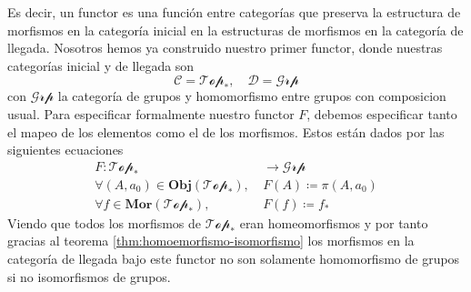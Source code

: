 {Es decir, un functor es una función entre categorías que preserva la
estructura de morfismos en la categoría inicial en la estructuras de
morfismos en la categoría de llegada. Nosotros hemos ya construido
nuestro primer functor, donde nuestras categorías inicial y de llegada son
\[ \mathcal C = \mathscr{Top}_* ,  \quad \mathcal D
  = \mathscr{Grp} \]
con \(\mathscr{Grp}\) la categoría de grupos y homomorfismo entre
grupos con composicion usual. Para especificar formalmente nuestro
functor \(F\), debemos especificar tanto el mapeo de los elementos como
el de los morfismos. Estos están dados por las siguientes ecuaciones
\begin{align*}
  F : \mathscr{Top}_* &\longrightarrow \mathscr{Grp} \\
  \forall (A, a_0) \in \mathbf{Obj} \left( \mathscr{Top}_* \right),\
    &F(A) \coloneqq \pi (A, a_0) \\
  \forall f \in \mathbf{Mor} \left( \mathscr{Top}_* \right),\ &F(f) \coloneqq
    f_*
\end{align*}
Viendo que todos los morfismos de \(\mathscr{Top}_*\) eran homeomorfismos
y por tanto gracias al teorema \ref{thm:homoemorfismo-isomorfismo} los
morfismos en la categoría de llegada bajo este functor no son solamente
homomorfismo de grupos si no isomorfismos de grupos.
}